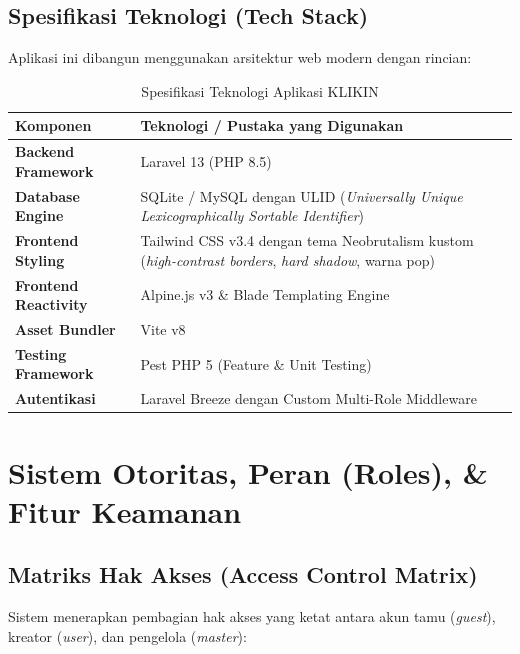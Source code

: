 \documentclass[12pt,a4paper]{article}
\begin{document}
\subsection{Spesifikasi Teknologi (Tech Stack)}
Aplikasi ini dibangun menggunakan arsitektur web modern dengan rincian:
\begin{table}[H]
    \centering
    \caption{Spesifikasi Teknologi Aplikasi KLIKIN}
    \begin{tabularx}{\textwidth}{lX}
        \toprule
        \textbf{Komponen} & \textbf{Teknologi / Pustaka yang Digunakan} \\
        \midrule
        \textbf{Backend Framework} & Laravel 13 (PHP 8.5) \\
        \textbf{Database Engine} & SQLite / MySQL dengan ULID (\textit{Universally Unique Lexicographically Sortable Identifier}) \\
        \textbf{Frontend Styling} & Tailwind CSS v3.4 dengan tema Neobrutalism kustom (\textit{high-contrast borders}, \textit{hard shadow}, warna pop) \\
        \textbf{Frontend Reactivity} & Alpine.js v3 \& Blade Templating Engine \\
        \textbf{Asset Bundler} & Vite v8 \\
        \textbf{Testing Framework} & Pest PHP 5 (Feature \& Unit Testing) \\
        \textbf{Autentikasi} & Laravel Breeze dengan Custom Multi-Role Middleware \\
        \bottomrule
    \end{tabularx}
\end{table}

\newpage

\section{Sistem Otoritas, Peran (Roles), \& Fitur Keamanan}

\subsection{Matriks Hak Akses (Access Control Matrix)}
Sistem menerapkan pembagian hak akses yang ketat antara akun tamu (\textit{guest}), kreator (\textit{user}), dan pengelola (\textit{master}):
\end{document}
